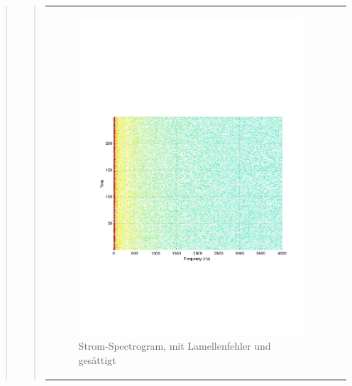 \begin{quote}
\begin{quote}
\begin{center}
\begin{tabular}{ll}
\begin{minipage}{0.6\textwidth}
                    \end{minipage}
                    \begin{minipage}{0.6\textwidth}
    
                        \begin{figure}[H]
                            \label{fig:}
                            \includegraphics[scale=0.4, trim = 2cm 6cm 1cm
                            7.5cm,
                            clip]{./Bilder/Termin8/lamellenfehler_gesaettig_Spectrogam.pdf}
                            \caption{Strom-Spectrogram, mit Lamellenfehler und
                            gesättigt}
                        \end{figure}
                    \vspace{-1.5em}
    

\end{minipage}
\end{tabular}
\end{center}
\end{quote}
\end{quote}

